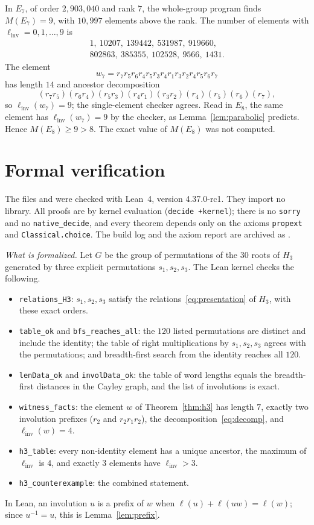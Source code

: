 \documentclass[11pt]{amsart}
\theoremstyle{definition}\newtheorem{definition}[theorem]{Definition}
\theoremstyle{remark}\newtheorem{remark}[theorem]{Remark}
\newcommand{\linv}{\ell_{\mathrm{inv}}}
\begin{document}
In \(E_7\), of order \(2{,}903{,}040\) and rank \(7\), the whole-group program finds \(M(E_7)=9\), with \(10{,}997\) elements above the rank. The number of elements with \(\linv=0,1,\dots,9\) is
\[
\begin{array}{l}
1,\ 10207,\ 139442,\ 531987,\ 919660,\\
802863,\ 385355,\ 102528,\ 9566,\ 1431.
\end{array}
\]
The element
\[
w_7=r_7r_5r_6r_4r_5r_3r_4r_1r_3r_2r_4r_5r_6r_7
\]
has length \(14\) and ancestor decomposition
\[
(r_7r_5)(r_6r_4)(r_5r_3)(r_4r_1)(r_3r_2)(r_4)(r_5)(r_6)(r_7),
\]
so \(\linv(w_7)=9\); the single-element checker agrees. Read in \(E_8\), the same element has \(\linv(w_7)=9\) by the checker, as Lemma~\ref{lem:parabolic} predicts. Hence \(M(E_8)\ge9>8\). The exact value of \(M(E_8)\) was not computed.

\section{Formal verification}\label{sec:lean}

The files  and  were checked with Lean~4, version 4.37.0-rc1. They import no library. All proofs are by kernel evaluation (\texttt{decide +kernel}); there is no \texttt{sorry} and no \texttt{native\_decide}, and every theorem depends only on the axioms \texttt{propext} and \texttt{Classical.choice}. The build log and the axiom report are archived as .

\emph{What is formalized.} Let \(G\) be the group of permutations of the \(30\) roots of \(H_3\) generated by three explicit permutations \(s_1,s_2,s_3\). The Lean kernel checks the following.
\begin{itemize}
\item \texttt{relations\_H3}: \(s_1,s_2,s_3\) satisfy the relations~\eqref{eq:presentation} of \(H_3\), with these exact orders.
\item \texttt{table\_ok} and \texttt{bfs\_reaches\_all}: the \(120\) listed permutations are distinct and include the identity; the table of right multiplications by \(s_1,s_2,s_3\) agrees with the permutations; and breadth-first search from the identity reaches all \(120\).
\item \texttt{lenData\_ok} and \texttt{involData\_ok}: the table of word lengths equals the breadth-first distances in the Cayley graph, and the list of involutions is exact.
\item \texttt{witness\_facts}: the element \(w\) of Theorem~\ref{thm:h3} has length \(7\), exactly two involution prefixes (\(r_2\) and \(r_2r_1r_2\)), the decomposition~\eqref{eq:decomp}, and \(\linv(w)=4\).
\item \texttt{h3\_table}: every non-identity element has a unique ancestor, the maximum of \(\linv\) is \(4\), and exactly \(3\) elements have \(\linv>3\).
\item \texttt{h3\_counterexample}: the combined statement.
\end{itemize}
In Lean, an involution \(u\) is a prefix of \(w\) when \(\ell(u)+\ell(uw)=\ell(w)\); since \(u^{-1}=u\), this is Lemma~\ref{lem:prefix}.
\end{document}
